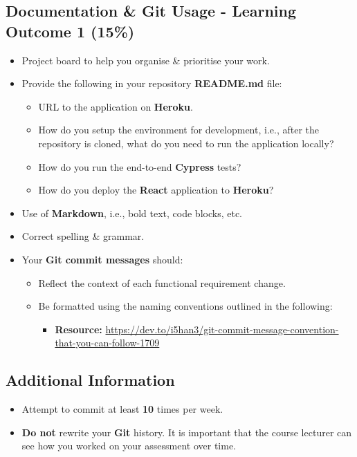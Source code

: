 \documentclass{article}
\begin{document}
\subsection*{Documentation \& Git Usage - Learning Outcome 1 (15\%)}
\begin{itemize}
	\item Project board to help you organise \& prioritise your work. 
	\item Provide the following in your repository \textbf{README.md} file:
		\begin{itemize}
		\item URL to the application on \textbf{Heroku}.
		\item How do you setup the environment for development, i.e., after the repository is cloned, what do you need to run the application locally?
		\item How do you run the end-to-end \textbf{Cypress} tests?
		\item How do you deploy the \textbf{React} application to \textbf{Heroku}?
		\end{itemize}
		\item Use of \textbf{Markdown}, i.e., bold text, code blocks, etc.
		\item Correct spelling \& grammar.
	\item Your \textbf{Git commit messages} should:
	      \begin{itemize}
	      	\item Reflect the context of each functional requirement change. 
	      	\item Be formatted using the naming conventions outlined in the following:
	      	      \begin{itemize}
	      	      	\item \textbf{Resource:} \small\href{https://dev.to/i5han3/git-commit-message-convention-that-you-can-follow-1709}{https://dev.to/i5han3/git-commit-message-convention-that-you-can-follow-1709}
	      	      \end{itemize} 
	      \end{itemize}
\end{itemize}
          
\subsection*{Additional Information}
\begin{itemize}
    \item Attempt to commit at least \textbf{10} times per week.
    \item \textbf{Do not} rewrite your \textbf{Git} history. It is important that the course lecturer can see how you worked on your assessment over time. 
\end{itemize} 
\end{document}
